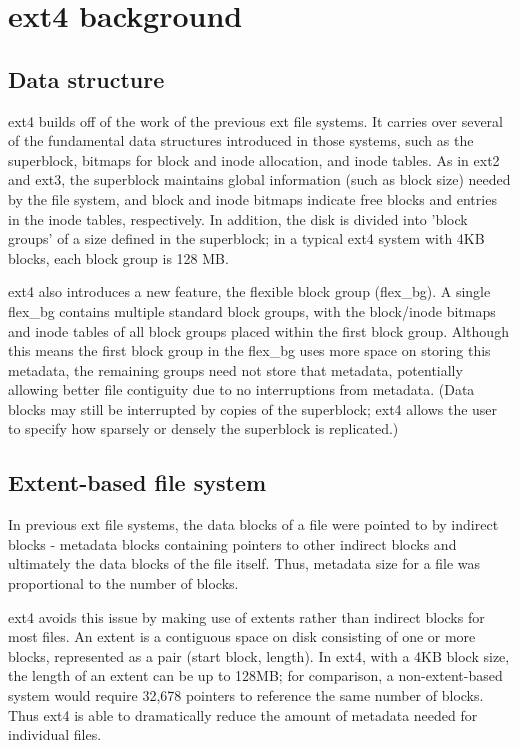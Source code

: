 \documentclass{acm_proc_article-sp}
\begin{document}
\section{ext4 background}
\label{sec:ext4-background}
\subsection{Data structure}
ext4 builds off of the work of the previous ext file systems.  It carries over several of the fundamental data structures introduced in those systems, such as the superblock, bitmaps for block and inode allocation, and inode tables.  As in ext2 and ext3, the superblock maintains global information (such as block size) needed by the file system, and block and inode bitmaps indicate free blocks and entries in the inode tables, respectively.  In addition, the disk is divided into 'block groups' of a size defined in the superblock; in a typical	 ext4 system with 4KB blocks, each block group is 128 MB.
 
ext4 also introduces a new feature, the flexible block group (flex\_bg).  A single flex\_bg contains multiple standard block groups, with the block/inode bitmaps and inode tables of all block groups placed within the first block group.  Although this means the first block group in the flex\_bg uses more space on storing this metadata, the remaining groups need not store that metadata, potentially allowing better file contiguity due to no interruptions from metadata.  (Data blocks may still be interrupted by copies of the superblock; ext4 allows the user to specify how sparsely or densely the superblock is replicated.)\cite{ext4kernelnewbies}

\subsection{Extent-based file system}
In previous ext file systems, the data blocks of a file were pointed to by indirect blocks - metadata blocks containing pointers to other indirect blocks and ultimately the data blocks of the file itself.  Thus, metadata size for a file was proportional to the number of blocks.
 
 
ext4 avoids this issue by making use of extents rather than indirect blocks for most files.  An extent is a contiguous space on disk consisting of one or more blocks, represented as a pair (start block, length).  In ext4, with a 4KB block size, the length of an extent can be up to 128MB; for comparison, a non-extent-based system would require 32,678 pointers to reference the same number of blocks.  Thus ext4 is able to dramatically reduce the amount of metadata needed for individual files.
\end{document}
